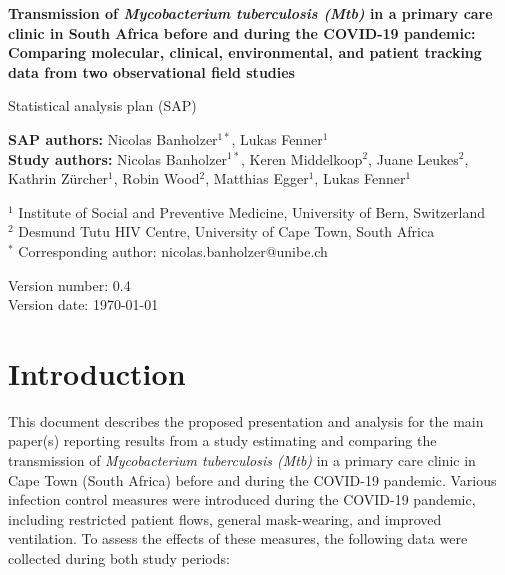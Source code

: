 \documentclass{article}
\begin{document}
\begin{titlepage}
        \vspace*{1cm}
            
        \LARGE
        \textbf{Transmission of \emph{Mycobacterium tuberculosis (\emph{Mtb})} in a primary care clinic in South Africa before and during the COVID-19 pandemic: Comparing molecular, clinical, environmental, and patient tracking data from two observational field studies}
            
        \vspace{0.5cm}
        \Large
        Statistical analysis plan (SAP)
            
        \vspace{1.5cm}
            
        \textbf{SAP authors:} Nicolas Banholzer$^{1*}$, Lukas Fenner$^1$ \\
        \textbf{Study authors:} Nicolas Banholzer$^{1*}$, Keren Middelkoop$^{2}$, Juane Leukes$^{2}$, Kathrin Z\"urcher$^{1}$, Robin Wood$^{2}$, Matthias Egger$^1$, Lukas Fenner$^1$

        \vspace{1cm}

        $^1$ Institute of Social and Preventive Medicine, University of Bern, Switzerland \\
        $^2$ Desmund Tutu HIV Centre, University of Cape Town, South Africa \\
        $^*$ Corresponding author: nicolas.banholzer@unibe.ch
            
        \vfill
            
        \Large
        Version number: 0.4 \\
        Version date: \today 

        \vspace*{1cm}
\end{titlepage}

\tableofcontents

\clearpage

\section{Introduction}

This document describes the proposed presentation and analysis for the main paper(s) reporting results from a study estimating and comparing the transmission of \emph{Mycobacterium tuberculosis (\emph{Mtb})} in a primary care clinic in Cape Town (South Africa) before and during the COVID-19 pandemic. Various infection control measures were introduced during the COVID-19 pandemic, including restricted patient flows, general mask-wearing, and improved ventilation. To assess the effects of these measures, the following data were collected during both study periods:
\end{document}
